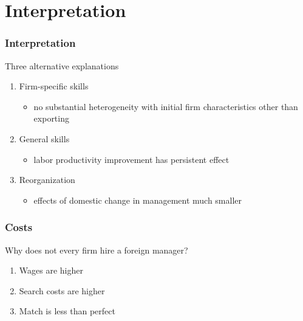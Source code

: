 \documentclass[aspectratio=169,compress,mathserif]{beamer}
\begin{document}
\section{Interpretation}\hypertarget{Interpretation}{}
\begin{frame}\frametitle{Interpretation}\hypertarget{Interpretation}{}
Three alternative explanations


\begin{enumerate}\setcounter{enumi}{0}
\item Firm-specific skills
\begin{itemize}
\item no substantial heterogeneity with initial firm characteristics other than exporting
\end{itemize}

\item General skills
\begin{itemize}
\item labor productivity improvement has persistent effect
\end{itemize}

\item Reorganization
\begin{itemize}
\item effects of domestic change in management much smaller


\end{itemize}

\end{enumerate}
\end{frame}



\begin{frame}\frametitle{Costs}\hypertarget{Costs}{}
Why does not every firm hire a foreign manager?


\begin{enumerate}\setcounter{enumi}{0}
\item Wages are higher 

\item Search costs are higher

\item Match is less than perfect






\end{enumerate}
\end{frame}
\end{document}
